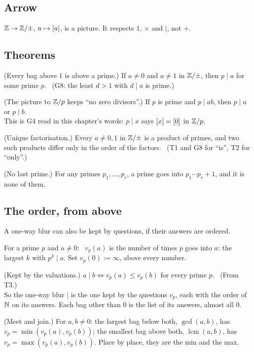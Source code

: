 \subsection*{Arrow}

\begin{lines}
\item[\lab{P12}] $\mathbb{Z} \to \mathbb{Z}/{\pm}$, $a \mapsto [a]$, is a picture. It respects $1$, $\times$ and $\mid$, not $+$.
\end{lines}

\subsection*{Theorems}

\begin{lines}
\item[\lab{T1}] (Every bag above $1$ is above a prime.) If $a \neq 0$ and $a \neq 1$ in $\mathbb{Z}/{\pm}$, then $p \mid a$ for some prime $p$. \ (G8: the least $d > 1$ with $d \mid a$ is prime.)
\item[\lab{T2}] (The picture to $\mathbb{Z}/p$ keeps ``no zero divisors''.) If $p$ is prime and $p \mid a b$, then $p \mid a$ or $p \mid b$. \\
This is G4 read in this chapter's words: $p \mid x$ says $[x] = [0]$ in $\mathbb{Z}/p$.
\item[\lab{T3}] (Unique factorisation.) Every $a \neq 0, 1$ in $\mathbb{Z}/{\pm}$ is a product of primes, and two such products differ only in the order of the factors. \ (T1 and G8 for ``is'', T2 for ``only''.)
\item[\lab{T4}] (No last prime.) For any primes $p_1, \dots, p_r$, a prime goes into $p_1 \cdots p_r + 1$, and it is none of them.
\end{lines}

\subsection*{The order, from above}

A one-way blur can also be kept by questions, if their answers are ordered.
\begin{lines}
\item[\lab{D4}] For a prime $p$ and $a \neq 0$: \ $v_p(a)$ is the number of times $p$ goes into $a$: the largest $k$ with $p^k \mid a$. Set $v_p(0) := \infty$, above every number.
\item[\lab{T5}] (Kept by the valuations.) $a \mid b \iff v_p(a) \le v_p(b)$ for every prime $p$. \ (From T3.) \\
So the one-way blur $\mid$ is the one kept by the questions $v_p$, each with the order of $\mathbb{N}$ on its answers. Each bag other than $0$ is the list of its answers, almost all $0$.
\item[\lab{T6}] (Meet and join.) For $a, b \neq 0$: the largest bag below both, $\gcd(a, b)$, has $v_p = \min(v_p(a), v_p(b))$; the smallest bag above both, $\operatorname{lcm}(a, b)$, has $v_p = \max(v_p(a), v_p(b))$. Place by place, they are the min and the max.
\end{lines}

